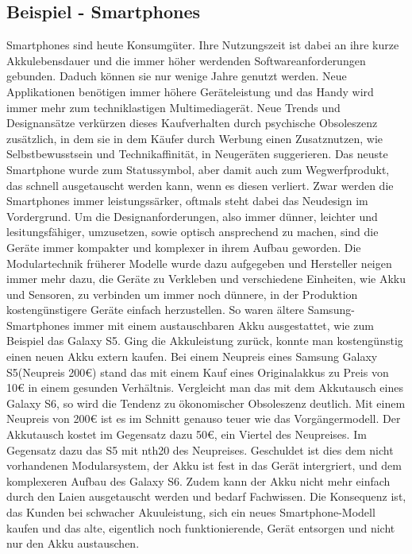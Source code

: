 \documentclass[13pt,titlepage]{article}
\begin{document}
\subsection {Beispiel - Smartphones}
	Smartphones sind heute Konsumg\"uter.
Ihre Nutzungszeit ist dabei an ihre kurze Akkulebensdauer und die immer h\"oher werdenden Softwareanforderungen gebunden.
Daduch k\"onnen sie nur wenige Jahre genutzt werden.
Neue Applikationen ben\"otigen immer h\"ohere Ger\"ateleistung und das Handy wird immer mehr zum techniklastigen Multimediager\"at.
Neue Trends und Designans\"atze verk\"urzen dieses Kaufverhalten durch psychische Obsoleszenz zus\"atzlich, in dem sie in dem K\"aufer durch Werbung einen Zusatznutzen, wie Selbstbewusstsein und Technikaffinit\"at, in Neuger\"aten suggerieren.
Das neuste Smartphone wurde zum Statussymbol, aber damit auch zum Wegwerfprodukt, das schnell ausgetauscht werden kann, wenn es diesen verliert.
Zwar werden die Smartphones immer leistungss\"arker, oftmals steht dabei das Neudesign im Vordergrund.
Um die Designanforderungen, also immer d\"unner, leichter und lesitungsf\"ahiger, umzusetzen, sowie optisch ansprechend zu machen, sind die Ger\"ate immer kompakter und komplexer in ihrem Aufbau geworden. 
Die Modulartechnik fr\"uherer Modelle wurde dazu aufgegeben und Hersteller neigen immer mehr dazu, die Ger\"ate zu Verkleben und verschiedene Einheiten, wie Akku und Sensoren, zu verbinden um immer noch d\"unnere, in der Produktion kosteng\"unstigere Ger\"ate einfach herzustellen.
So waren \"altere Samsung-Smartphones immer mit einem austauschbaren Akku ausgestattet, wie zum Beispiel das Galaxy S5. Ging die Akkuleistung zur\"uck, konnte man kosteng\"unstig einen neuen Akku extern kaufen. 
Bei einem Neupreis eines Samsung Galaxy S5(Neupreis 200\euro{}) stand das mit einem Kauf eines Originalakkus zu Preis von 10\euro{} in einem gesunden Verh\"altnis.
Vergleicht man das mit dem Akkutausch eines Galaxy S6, so wird die Tendenz zu \"okonomischer Obsoleszenz deutlich. Mit einem Neupreis von 200\euro{} ist es im Schnitt genauso teuer wie das Vorg\"angermodell. 
Der Akkutausch kostet im Gegensatz dazu 50\euro{}, ein Viertel des Neupreises. Im Gegensatz dazu das S5 mit nth{20} des Neupreises.
Geschuldet ist dies dem nicht vorhandenen Modularsystem, der Akku ist fest in das Ger\"at intergriert, und dem komplexeren Aufbau des Galaxy S6. 
Zudem kann der Akku nicht mehr einfach durch den Laien ausgetauscht werden und bedarf Fachwissen.
Die Konsequenz ist, das Kunden bei schwacher Akuuleistung, sich ein neues Smartphone-Modell kaufen und das alte, eigentlich noch funktionierende, Ger\"at entsorgen und nicht nur den Akku austauschen.
\end{document}
